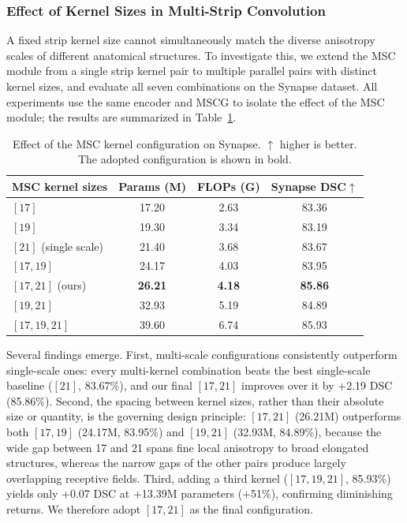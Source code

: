 \documentclass{llncs}
\begin{document}
\subsubsection{Effect of Kernel Sizes in Multi-Strip Convolution}


A fixed strip kernel size cannot simultaneously match the diverse anisotropy scales of different anatomical structures. To investigate this, we extend the MSC module from a single strip kernel pair to multiple parallel pairs with distinct kernel sizes, and evaluate all seven combinations on the Synapse dataset. All experiments use the same encoder and MSCG to isolate the effect of the MSC module; the results are summarized in Table~\ref{table_sc_ablation}.

\begin{table}[!htbp]
\centering
\footnotesize
\caption{Effect of the MSC kernel configuration on Synapse. $\uparrow$ higher is better. The adopted configuration is shown in bold.}
\label{table_sc_ablation}
\begin{tabular}{l|cc|c}
\hline
MSC kernel sizes & Params (M) & FLOPs (G) & Synapse DSC$\uparrow$ \\
\hline
$[17]$                   & 17.20 & 2.63 & 83.36 \\
$[19]$                   & 19.30 & 3.34 & 83.19 \\
$[21]$ (single scale)    & 21.40 & 3.68 & 83.67 \\
$[17,19]$                & 24.17 & 4.03 & 83.95 \\
$[17,21]$ (ours)         & \textbf{26.21} & \textbf{4.18} & \textbf{85.86} \\
$[19,21]$                & 32.93 & 5.19 & 84.89 \\
$[17,19,21]$             & 39.60 & 6.74 & 85.93 \\
\hline
\end{tabular}
\end{table}

Several findings emerge. First, multi-scale configurations consistently outperform single-scale ones: every multi-kernel combination beats the best single-scale baseline ($[21]$, 83.67\%), and our final $[17,21]$ improves over it by +2.19 DSC (85.86\%). Second, the spacing between kernel sizes, rather than their absolute size or quantity, is the governing design principle: $[17,21]$ (26.21M) outperforms both $[17,19]$ (24.17M, 83.95\%) and $[19,21]$ (32.93M, 84.89\%), because the wide gap between 17 and 21 spans fine local anisotropy to broad elongated structures, whereas the narrow gaps of the other pairs produce largely overlapping receptive fields. Third, adding a third kernel ($[17,19,21]$, 85.93\%) yields only +0.07 DSC at +13.39M parameters (+51\%), confirming diminishing returns. We therefore adopt $[17,21]$ as the final configuration.
\end{document}

